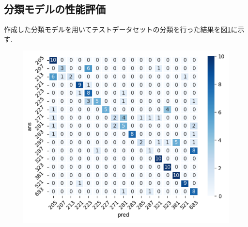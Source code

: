 \begin{multicols*}{2}
\subsection{分類モデルの性能評価}
作成した分類モデルを用いてテストデータセットの分類を行った結果を図\ref{fig:classifyresults}に示す.
\begin{figure}
	\centering
	\includegraphics[width=\linewidth]{obj/classify_results.pdf}
	\label{fig:classifyresults}
\end{figure}


\end{multicols*}
